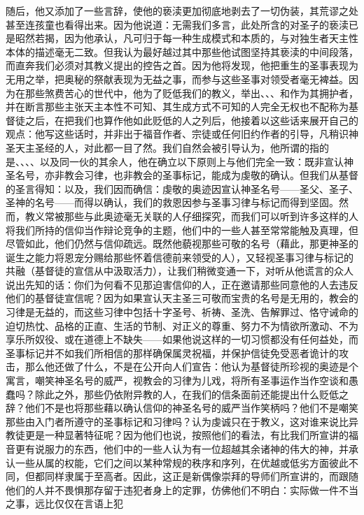 随后，他又添加了一些言辞，使他的亵渎更加彻底地剥去了一切伪装，其荒谬之处甚至连孩童也看得出来。因为他说道：无需我们多言，此处所含的对圣子的亵渎已是昭然若揭，因为他承认，凡可归于每一种生成模式和本质的，与对独生者天主性本体的描述毫无二致。但我认为最好越过其中那些他试图坚持其亵渎的中间段落，而直奔我们必须对其教义提出的控告之首。因为他将发现，他把重生的圣事表现为无用之举，把奥秘的祭献表现为无益之事，而参与这些圣事对领受者毫无裨益。因为在那些煞费苦心的世代中，他为了贬低我们的教义，举出、、、和作为其拥护者，并在断言那些主张天主本性不可知、其生成方式不可知的人完全无权也不配称为基督徒之后，在把我们也算作他如此贬低的人之列后，他接着以这些话来展开自己的观点：他写这些话时，并非出于福音作者、宗徒或任何旧约作者的引导，凡稍识神圣天主圣经的人，对此都一目了然。我们自然会被引导认为，他所谓的指的是、、、、以及同一伙的其余人，他在确立以下原则上与他们完全一致：既非宣认神圣名号，亦非教会习律，也非教会的圣事标记，能成为虔敬的确认。但我们从基督的圣言得知：以及，我们因而确信：虔敬的奥迹因宣认神圣名号——圣父、圣子、圣神的名号——而得以确认，我们的救恩因参与圣事习律与标记而得到坚固。然而，教义常被那些与此奥迹毫无关联的人仔细探究，而我们可以听到许多这样的人将我们所持的信仰当作辩论竞争的主题，他们中的一些人甚至常常能触及真理，但尽管如此，他们仍然与信仰疏远。既然他藐视那些可敬的名号（藉此，那更神圣的诞生之能力将恩宠分赐给那些怀着信德前来领受的人），又轻视圣事习律与标记的共融（基督徒的宣信从中汲取活力），让我们稍微变通一下，对听从他谎言的众人说出先知的话：你们为何看不见那迫害信仰的人，正在邀请那些同意他的人去违反他们的基督徒宣信呢？因为如果宣认天主圣三可敬而宝贵的名号是无用的，教会的习律是无益的，而这些习律中包括十字圣号、祈祷、圣洗、告解罪过、恪守诫命的迫切热忱、品格的正直、生活的节制、对正义的尊重、努力不为情欲所激动、不为享乐所奴役、或在道德上不缺失——如果他说这样的一切习惯都没有任何益处，而圣事标记并不如我们所相信的那样确保属灵祝福，并保护信徒免受恶者诡计的攻击，那么他还做了什么，不是在公开向人们宣告：他认为基督徒所珍视的奥迹是个寓言，嘲笑神圣名号的威严，视教会的习律为儿戏，将所有圣事运作当作空谈和愚蠢吗？除此之外，那些仍依附异教的人，在我们的信条面前还能提出什么贬低之辞？他们不是也将那些藉以确认信仰的神圣名号的威严当作笑柄吗？他们不是嘲笑那些由入门者所遵守的圣事标记和习律吗？认为虔诚只在于教义，这对谁来说比异教徒更是一种显著特征呢？因为他们也说，按照他们的看法，有比我们所宣讲的福音更有说服力的东西，他们中的一些人认为有一位超越其余诸神的伟大的神，并承认一些从属的权能，它们之间以某种常规的秩序和序列，在优越或低劣方面彼此不同，但都同样隶属于至高者。因此，这正是新偶像崇拜的导师们所宣讲的，而跟随他们的人并不畏惧那存留于违犯者身上的定罪，仿佛他们不明白：实际做一件不当之事，远比仅仅在言语上犯